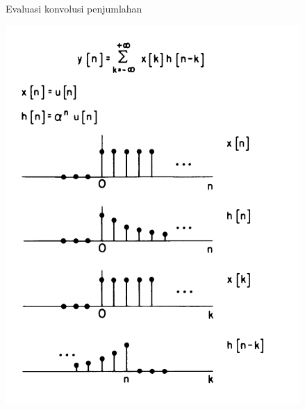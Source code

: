 \documentclass[aspectratio=169]{beamer}
\begin{document}
\begin{frame}{Evaluasi konvolusi penjumlahan}
	\begin{center}
		\includegraphics[height=0.8\textheight]{gambar/03.konvolusi/fig.4.09}
	\end{center}
\end{frame}
\end{document}
